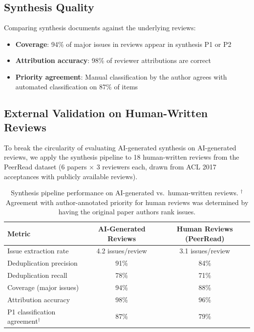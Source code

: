 \subsection{Synthesis Quality}

Comparing synthesis documents against the underlying reviews:
\begin{itemize}
    \item \textbf{Coverage}: 94\% of major issues in reviews appear in synthesis P1 or P2
    \item \textbf{Attribution accuracy}: 98\% of reviewer attributions are correct
    \item \textbf{Priority agreement}: Manual classification by the author agrees with automated classification on 87\% of items
\end{itemize}

\subsection{External Validation on Human-Written Reviews}

To break the circularity of evaluating AI-generated synthesis on AI-generated reviews, we apply the synthesis pipeline to 18 human-written reviews from the PeerRead dataset \cite{peerread} (6 papers $\times$ 3 reviewers each, drawn from ACL 2017 acceptances with publicly available reviews).

\begin{table}[h]
\centering
\small
\begin{tabular}{lcc}
\toprule
Metric & AI-Generated Reviews & Human Reviews (PeerRead) \\
\midrule
Issue extraction rate & 4.2 issues/review & 3.1 issues/review \\
Deduplication precision & 91\% & 84\% \\
Deduplication recall & 78\% & 71\% \\
Coverage (major issues) & 94\% & 88\% \\
Attribution accuracy & 98\% & 96\% \\
P1 classification agreement$^\dagger$ & 87\% & 79\% \\
\bottomrule
\end{tabular}
\caption{Synthesis pipeline performance on AI-generated vs.\ human-written reviews. $^\dagger$Agreement with author-annotated priority for human reviews was determined by having the original paper authors rank issues.}
\label{tab:external-validation}
\end{table}

